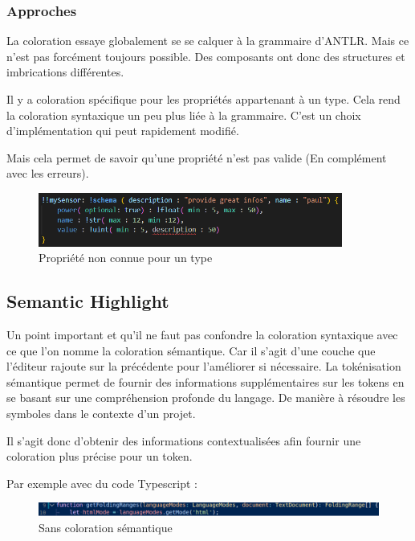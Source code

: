 \documentclass[
    iict, %
    il, %
]{heig-tb}
\begin{document}
\subsubsection{Approches}
La coloration essaye globalement se se calquer à la grammaire d'ANTLR. Mais ce n'est pas forcément toujours possible.
Des composants ont donc des structures et imbrications différentes.

Il y a coloration spécifique pour les propriétés appartenant à un type.
Cela rend la coloration syntaxique un peu plus liée à la grammaire.
C'est un choix d'implémentation qui peut rapidement modifié.

Mais cela permet de savoir qu'une propriété n'est pas valide (En complément avec les erreurs).

\begin{figure}[!h]
    \begin{center}
        \includegraphics[width=10cm]{assets/figures/uon-unkown-type.PNG}
    \end{center}
    \caption[Propriété non connue pour un type]{\label{example-uon-coloration} Propriété non connue pour un type}
\end{figure}


\subsection{Semantic Highlight}

Un point important et qu'il ne faut pas confondre la coloration syntaxique avec ce que l'on nomme la coloration sémantique. Car il s'agit d'une couche que l'éditeur rajoute sur la précédente pour l'améliorer si nécessaire.
La tokénisation sémantique permet de fournir des informations supplémentaires sur les tokens en se basant sur une compréhension profonde du langage.
De manière à résoudre les symboles dans le contexte d'un projet.

Il s'agit donc d'obtenir des informations contextualisées afin fournir une coloration plus précise pour un token.

Par exemple avec du code Typescript :

\begin{figure}[!h]
    \begin{center}
        \includegraphics[width=15cm]{assets/figures/semantic-coloration-without.png}
    \end{center}
    \caption[Exemple sans coloration sémantique]{\label{semantic-coloration-without} Sans coloration sémantique}
\end{figure}
\end{document}
